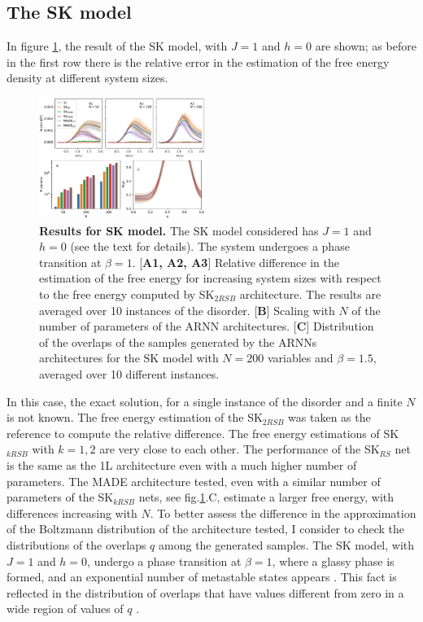\documentclass[aps,physrev,10pt,floatfix,reprint]{revtex4-2}
\begin{document}
\subsection{The SK model}
In figure \ref{fig:SK}, the result of the SK model, with $J=1$ and $h=0$ are shown; as before in the first row there is the relative error in the estimation of the free energy density at different system sizes. 
\begin{figure}[h]
    \centering 
    \includegraphics[width=0.48\textwidth]{img/SK_res.pdf}
    \caption{\textbf{Results for SK model.} The SK model considered has $J=1$ and $h=0$ (see the text for details). The system undergoes a phase transition at $\beta=1$\cite{10.1142/0271}. [\textbf{A1, A2, A3}] Relative difference in the estimation of the free energy for increasing system sizes with respect to the free energy computed by SK$_{2RSB}$ architecture. The results are averaged over 10 instances of the disorder. [\textbf{B}] Scaling with $N$ of the number of parameters of the ARNN architectures. [\textbf{C}] Distribution of the overlaps of the samples generated by the ARNNs architectures for the SK model with $N=200$ variables and $\beta=1.5$, averaged over 10 different instances.}
    \label{fig:SK}
\end{figure}
In this case, the exact solution, for a single instance of the disorder and a finite $N$ is not known. The free energy estimation of the SK$_{2RSB}$ was taken as the reference to compute the relative difference. The free energy estimations of SK$_{kRSB}$ with $k=1,2$ are very close to each other.
The performance of the SK$_{RS}$ net is the same as the 1L architecture even with a much higher number of parameters. The MADE architecture tested, even with a similar number of parameters of the SK$_{kRSB}$ nets, see fig.\ref{fig:SK}.C, estimate a larger free energy, with differences increasing with $N$.
To better assess the difference in the approximation of the Boltzmann distribution of the architecture tested, I consider to check the distributions of the overlaps $q$ among the generated samples. The SK model, with $J=1$ and $h=0$, undergo a phase transition at $\beta=1$, where a glassy phase is formed, and an exponential number of metastable states appears \cite{10.1142/0271}. This fact is reflected in the distribution of overlaps that have values different from zero in a wide region of values of $q$ \cite{PhysRevLett.51.1206}.
\end{document}
